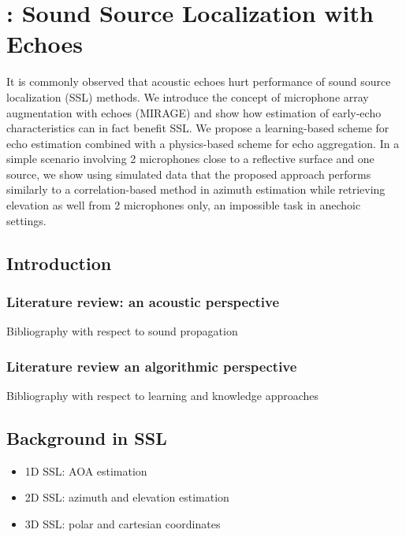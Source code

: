 \chapter{\mirage: Sound Source Localization with Echoes}\label{chap:mirage}

It is commonly observed that acoustic echoes hurt performance of sound source localization (SSL) methods.
We introduce the concept of microphone array augmentation with echoes (MIRAGE) and
show how estimation of early-echo characteristics can in fact benefit SSL.
We propose a learning-based scheme for echo estimation combined with a physics-based scheme for echo aggregation.
In a simple scenario involving 2 microphones close to a reflective surface and one source,
we show using simulated data that the proposed approach performs similarly
to a correlation-based method in azimuth estimation while retrieving
elevation as well from 2 microphones only, an impossible task in anechoic settings.

\section{Introduction}

\subsection{Literature review: an acoustic perspective}
Bibliography with respect to sound propagation

\subsection{Literature review an algorithmic perspective}
Bibliography with respect to learning and knowledge approaches



\section{Background in SSL}
\begin{itemize}
    \item 1D SSL: AOA estimation
    \item 2D SSL: azimuth and elevation estimation
    \item 3D SSL: polar and cartesian coordinates
\end{itemize}

